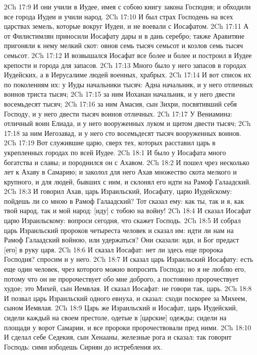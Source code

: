 2Ch 17:9  И они учили в Иудее, имея с собою книгу закона Господня; и обходили все города Иудеи и учили народ.
2Ch 17:10  И был страх Господень на всех царствах земель, которые вокруг Иудеи, и не воевали с Иосафатом.
2Ch 17:11  А от Филистимлян приносили Иосафату дары и в дань серебро; также Аравитяне пригоняли к нему мелкий скот: овнов семь тысяч семьсот и козлов семь тысяч семьсот.
2Ch 17:12  И возвышался Иосафат все более и более и построил в Иудее крепости и города для запасов.
2Ch 17:13  Много было у него запасов в городах Иудейских, а в Иерусалиме людей военных, храбрых.
2Ch 17:14  И вот список их по поколениям их: у Иуды начальники тысяч: Адна начальник, и у него отличных воинов триста тысяч;
2Ch 17:15  за ним Иоханан начальник, и у него двести восемьдесят тысяч;
2Ch 17:16  за ним Амасия, сын Зихри, посвятивший себя Господу, и у него двести тысяч воинов отличных.
2Ch 17:17  У Вениамина: отличный воин Елиада, и у него вооруженных луком и щитом двести тысяч;
2Ch 17:18  за ним Иегозавад, и у него сто восемьдесят тысяч вооруженных воинов.
2Ch 17:19  Вот служившие царю, сверх тех, которых расставил царь в укрепленных городах по всей Иудее.
2Ch 18:1  И было у Иосафата много богатства и славы; и породнился он с Ахавом.
2Ch 18:2  И пошел чрез несколько лет к Ахаву в Самарию; и заколол для него Ахав множество скота мелкого и крупного, и для людей, бывших с ним, и склонял его идти на Рамоф Галаадский.
2Ch 18:3  И говорил Ахав, царь Израильский, Иосафату, царю Иудейскому: пойдешь ли со мною в Рамоф Галаадский? Тот сказал ему: как ты, так и я, как твой народ, так и мой народ: [иду] с тобою на войну!
2Ch 18:4  И сказал Иосафат царю Израильскому: вопроси сегодня, что скажет Господь.
2Ch 18:5  И собрал царь Израильский пророков четыреста человек и сказал им: идти ли нам на Рамоф Галаадский войною, или удержаться? Они сказали: иди, и Бог предаст [его] в руку царя.
2Ch 18:6  И сказал Иосафат: нет ли здесь еще пророка Господня? спросим и у него.
2Ch 18:7  И сказал царь Израильский Иосафату: есть еще один человек, чрез которого можно вопросить Господа; но я не люблю его, потому что он не пророчествует обо мне доброго, а постоянно пророчествует худое; это Михей, сын Иемвлая. И сказал Иосафат: не говори так, царь.
2Ch 18:8  И позвал царь Израильский одного евнуха, и сказал: сходи поскорее за Михеем, сыном Иемвлая.
2Ch 18:9  Царь же Израильский и Иосафат, царь Иудейский, сидели каждый на своем престоле, одетые в [царские] одежды; сидели на площади у ворот Самарии, и все пророки пророчествовали пред ними.
2Ch 18:10  И сделал себе Седекия, сын Хенааны, железные рога и сказал: так говорит Господь: сими избодешь Сириян до истребления их.
